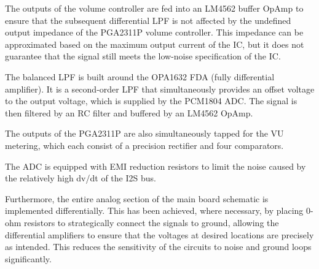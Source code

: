 The outputs of the volume controller are fed into an LM4562 buffer OpAmp to ensure that the subsequent differential LPF is not affected by the undefined output impedance of the PGA2311P volume controller. This impedance can be approximated based on the maximum output current of the IC, but it does not guarantee that the signal still meets the low-noise specification of the IC.

The balanced LPF is built around the OPA1632 FDA (fully differential amplifier). It is a second-order LPF that simultaneously provides an offset voltage to the output voltage, which is supplied by the PCM1804 ADC. The signal is then filtered by an RC filter and buffered by an LM4562 OpAmp.

The outputs of the PGA2311P are also simultaneously tapped for the VU metering, which each consist of a precision rectifier and four comparators.

The ADC is equipped with EMI reduction resistors to limit the noise caused by the relatively high dv/dt of the I2S bus.


Furthermore, the entire analog section of the main board schematic is implemented differentially. This has been achieved, where necessary, by placing 0-ohm resistors to strategically connect the signals to ground, allowing the differential amplifiers to ensure that the voltages at desired locations are precisely as intended. 
This reduces the sensitivity of the circuits to noise and ground loops significantly.